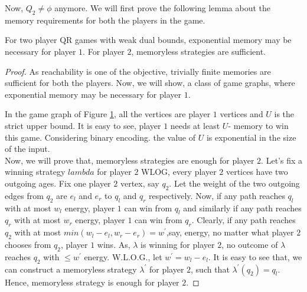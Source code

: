 Now, $Q_2 \not = \phi$ anymore. We will first prove the following lemma about the memory requirements for both the players in the game.\\
\begin{lemma}
\label{mem-lemma}
For two player QR games with weak dual bounds, exponential memory may be necessary for player $1$. For player $2$, memoryless strategies are sufficient.
\end{lemma}
\begin{proof}
As reachability is one of the objective, trivially finite memories are sufficient for both the players. Now, we will show, a class of game graphs, where exponential memory may be necessary for player $1$.\\
\begin{figure}[htb]
\hskip 6cm
\label{expmem-p1}

\end{figure}

In the game graph of Figure \ref{expmem-p1}, all the vertices are player $1$  vertices and $U$ is the strict upper bound. It is easy to see, player $1$ needs at least $U$- memory to win this game. Considering binary encoding. the value of $U$ is exponential in the size of the input.\\
Now, we will prove that, memoryless strategies are enough for player $2$. Let's fix a winning strategy $lambda$ for player $2$  WLOG, every player $2$ vertices have two outgoing ages. Fix one player $2$ vertex, say $q_2$. Let the weight of the two outgoing edges from $q_2$ are $e_l$ and $e_r$ to $q_l$ and $q_r$ respectively. Now, if any path reaches $q_l$ with at most $w_l$ energy, player $1$ can win from $q_l$ and similarly if any path reaches $q_r$ with at most $w_r$ energy, player $1$ can win from $q_r$. Clearly, if any path reaches $q_2$ with at most $min(w_l-e_l, w_r-e_r)= w^{\prime}$,say, energy, no matter what player $2$ chooses from $q_2$, player $1$ wins. As, $\lambda$ is winning for player $2$, no outcome of $\lambda$ reaches $q_2$ with $\leq w^{\prime}$ energy. W.L.O.G., let $w^{\prime}= w_l -e_l$. It is easy to see that, we can construct a memoryless strategy $\lambda^{\prime}$ for player $2$, such that $\lambda^{\prime}(q_2)=q_l$. Hence, memoryless strategy is enough for player $2$.
\end{proof}
